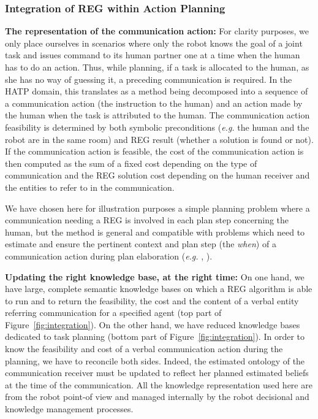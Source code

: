 \documentclass[a4paper,11pt,twoside]{StyleThese}
\begin{document}
\subsubsection{Integration of REG within Action Planning}
\textbf{The representation of the communication action:}
For clarity purposes, we only place ourselves in scenarios where only the robot knows the goal of a joint task and issues command to its human partner one at a time when the human has to do an action. Thus, while planning, if a task is allocated to the human, as she has no way of guessing it, a preceding communication is required. In the HATP domain, this translates as a method being decomposed into a sequence of a communication action (the instruction to the human) and an action made by the human when the task is attributed to the human. The communication action feasibility is determined by both symbolic preconditions (\textit{e.g.} the human and the robot are in the same room) and REG result (whether a solution is found or not). If the communication action is feasible, the cost of the communication action is then computed as the sum of a fixed cost depending on the type of communication and the REG solution cost depending on the human receiver and the entities to refer to in the communication.

We have chosen here for illustration purposes a simple planning problem where a communication needing a REG is involved in each plan step concerning the human, but the method is general and compatible with problems which need to  estimate and ensure the pertinent context and plan step (the \textit{when}) of a communication action during plan elaboration (\textit{e.g.} \cite{devin2016implemented}, \cite{unhelkar2020decision}).

\textbf{Updating the right knowledge base, at the right time:}
On one hand, we have large, complete semantic knowledge bases on which a REG algorithm is able to run and to return the feasibility, the cost and the content of a verbal entity referring communication for a specified agent (top part of Figure~\ref{fig:integration}). On the other hand, we have reduced knowledge bases dedicated to task planning (bottom part of Figure~\ref{fig:integration}). In order to know the feasibility and cost of a verbal communication action during the planning, we have to reconcile both sides. Indeed, the estimated ontology of the communication receiver must be updated to reflect her planned estimated beliefs at the time of the communication. All the knowledge representation used here are from the robot point-of view and managed internally by the robot decisional and knowledge management processes.
\end{document}
